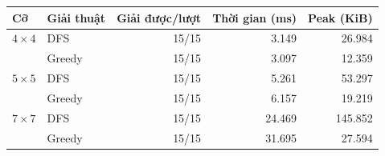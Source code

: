 \begin{center}
\small
\begin{tabular}{@{}llrrr@{}}
\toprule
Cỡ & Giải thuật & Giải được/lượt & Thời gian (ms) & Peak (KiB)\\
\midrule
$4\times4$ & DFS    & 15/15 & 3.149  & 26.984\\
           & Greedy & 15/15 & 3.097  & 12.359\\
$5\times5$ & DFS    & 15/15 & 5.261  & 53.297\\
           & Greedy & 15/15 & 6.157  & 19.219\\
$7\times7$ & DFS    & 15/15 & 24.469 & 145.852\\
           & Greedy & 15/15 & 31.695 & 27.594\\
\bottomrule
\end{tabular}
\end{center}
